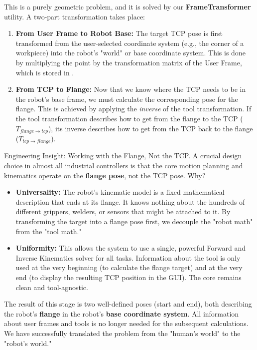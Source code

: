 This is a purely geometric problem, and it is solved by our \textbf{FrameTransformer} utility. A two-part transformation takes place:
\begin{enumerate}
    \item \textbf{From User Frame to Robot Base:} The target TCP pose is first transformed from the user-selected coordinate system (e.g., the corner of a workpiece) into the robot's "world" or base coordinate system. This is done by multiplying the point by the transformation matrix of the User Frame, which is stored in .
    \item \textbf{From TCP to Flange:} Now that we know where the TCP needs to be in the robot's base frame, we must calculate the corresponding pose for the flange. This is achieved by applying the \textit{inverse} of the tool transformation. If the tool transformation describes how to get from the flange to the TCP (\(T_{flange \to tcp}\)), its inverse describes how to get from the TCP back to the flange (\(T_{tcp \to flange}\)).
\end{enumerate}

\begin{tipbox}{Engineering Insight: Working with the Flange, Not the TCP.}
    A crucial design choice in almost all industrial controllers is that the core motion planning and kinematics operate on the \textbf{flange pose}, not the TCP pose. Why?
    \begin{itemize}
        \item \textbf{Universality:} The robot's kinematic model is a fixed mathematical description that ends at its flange. It knows nothing about the hundreds of different grippers, welders, or sensors that might be attached to it. By transforming the target into a flange pose first, we decouple the "robot math" from the "tool math."
        \item \textbf{Uniformity:} This allows the system to use a single, powerful Forward and Inverse Kinematics solver for all tasks. Information about the tool is only used at the very beginning (to calculate the flange target) and at the very end (to display the resulting TCP position in the GUI). The core remains clean and tool-agnostic.
    \end{itemize}
\end{tipbox}

The result of this stage is two well-defined poses (start and end), both describing the robot's \textbf{flange} in the robot's \textbf{base coordinate system}. All information about user frames and tools is no longer needed for the subsequent calculations. We have successfully translated the problem from the "human's world" to the "robot's world."

